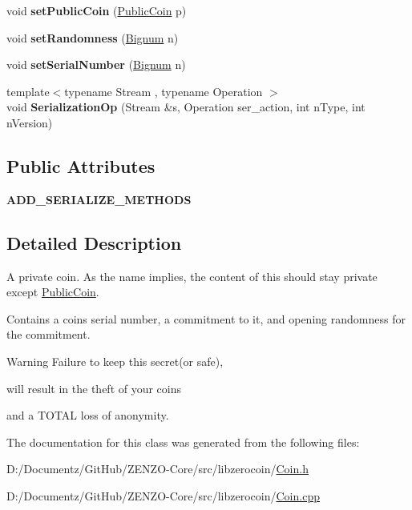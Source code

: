 \begin{DoxyCompactItemize}
void {\bfseries set\+Public\+Coin} (\mbox{\hyperlink{classlibzerocoin_1_1_public_coin}{Public\+Coin}} p)
\item 
\mbox{\label{classlibzerocoin_1_1_private_coin_af80430da4889f121463d3b307f1b54c1}} 
void {\bfseries set\+Randomness} (\mbox{\hyperlink{class_c_big_num}{Bignum}} n)
\item 
\mbox{\label{classlibzerocoin_1_1_private_coin_a5fab5444ca5ea9b46aef56cb76588f20}} 
void {\bfseries set\+Serial\+Number} (\mbox{\hyperlink{class_c_big_num}{Bignum}} n)
\item 
\mbox{\label{classlibzerocoin_1_1_private_coin_a0adbc7a836e42357b1dd424d1ff0784c}} 
{\footnotesize template$<$typename Stream , typename Operation $>$ }\\void {\bfseries Serialization\+Op} (Stream \&s, Operation ser\+\_\+action, int n\+Type, int n\+Version)
\end{DoxyCompactItemize}
\subsection*{Public Attributes}
\begin{DoxyCompactItemize}
\item 
\mbox{\label{classlibzerocoin_1_1_private_coin_a5f452ce485da2fce88de6868c2e9410b}} 
{\bfseries A\+D\+D\+\_\+\+S\+E\+R\+I\+A\+L\+I\+Z\+E\+\_\+\+M\+E\+T\+H\+O\+DS}
\end{DoxyCompactItemize}


\subsection{Detailed Description}
A private coin. As the name implies, the content of this should stay private except \mbox{\hyperlink{classlibzerocoin_1_1_public_coin}{Public\+Coin}}.

Contains a coin\textquotesingle{}s serial number, a commitment to it, and opening randomness for the commitment.

\begin{DoxyWarning}{Warning}
Failure to keep this secret(or safe), 

will result in the theft of your coins 

and a T\+O\+T\+AL loss of anonymity. 
\end{DoxyWarning}


The documentation for this class was generated from the following files\+:\begin{DoxyCompactItemize}
\item 
D\+:/\+Documentz/\+Git\+Hub/\+Z\+E\+N\+Z\+O-\/\+Core/src/libzerocoin/\mbox{\hyperlink{_coin_8h}{Coin.\+h}}\item 
D\+:/\+Documentz/\+Git\+Hub/\+Z\+E\+N\+Z\+O-\/\+Core/src/libzerocoin/\mbox{\hyperlink{_coin_8cpp}{Coin.\+cpp}}\end{DoxyCompactItemize}
